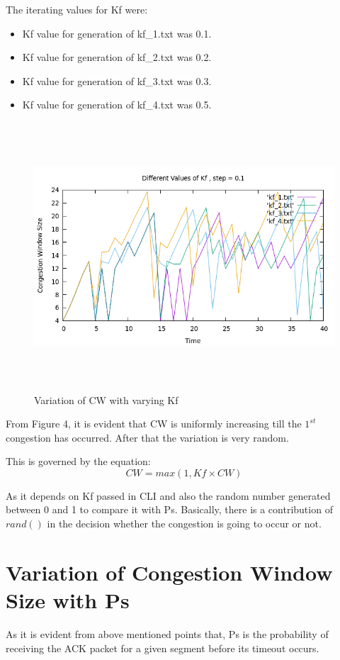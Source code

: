 \documentclass[12pt]{article}
\begin{document}
The iterating values for Kf were:
\begin{itemize}
    \item Kf value for generation of kf\_1.txt was 0.1.
    \item Kf value for generation of kf\_2.txt was 0.2.
    \item Kf value for generation of kf\_3.txt was 0.3.
    \item Kf value for generation of kf\_4.txt was 0.5.
\end{itemize}

\begin{figure}
    \centering
    \includegraphics[width=15cm, height=10cm]{kf.png}
    \caption{Variation of CW with varying Kf}
\end{figure}

From Figure 4, it is evident that CW is uniformly increasing till the $1^{st}$ congestion has occurred. After that the variation is very random.

This is governed by the equation:
\begin{equation*}
    CW = max(1, Kf \times CW)
\end{equation*}

As it depends on Kf passed in CLI and also the random number generated between 0 and 1 to compare it with Ps. Basically, there is a contribution of $rand()$ in the decision whether the congestion is going to occur or not.


\section{Variation of Congestion Window Size with Ps}
As it is evident from above mentioned points that, Ps is the probability of receiving the ACK packet for a given segment before its timeout occurs.
\end{document}
